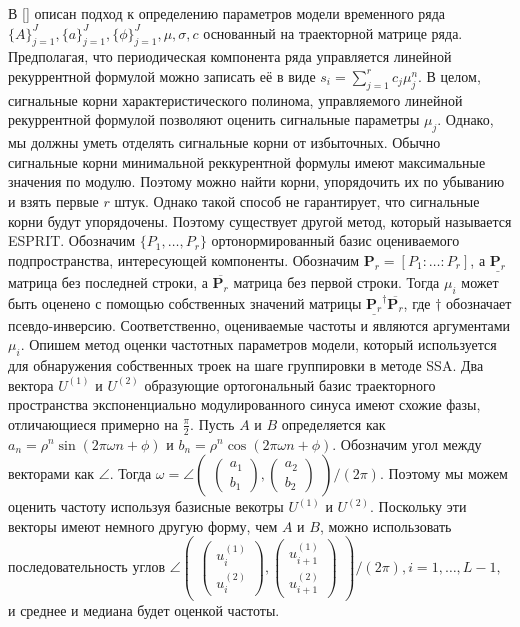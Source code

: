\documentclass[%
12pt,
master,  %
natbib,      %
subf,        %
substylefile = spbu.rtx,
href,        %
colorlinks,  %
]{disser}
\begin{document}
В [] описан подход к определению параметров модели временного ряда $ \{A\}_{j=1}^J,  \{a\}_{j=1}^J,  \{\phi\}_{j=1}^J, \mu, \sigma, c $ основанный на траекторной матрице ряда. Предполагая, что периодическая компонента ряда управляется линейной рекуррентной формулой можно записать её в виде $s_i = \sum_{j=1}^r c_j \mu_j^n$. В целом, сигнальные корни характеристического полинома, управляемого линейной рекуррентной формулой позволяют оценить сигнальные параметры $\mu_j$. Однако, мы должны уметь отделять сигнальные корни от избыточных. Обычно сигнальные корни минимальной реккурентной формулы имеют максимальные значения по модулю. Поэтому можно найти корни, упорядочить их по убыванию и взять первые $r$ штук. Однако такой способ не гарантирует, что сигнальные корни будут упорядочены. Поэтому существует другой метод, который называется ESPRIT.
Обозначим $\{P_1, \dots, P_r \}$ ортонормированный базис оцениваемого подпространства, интересующей компоненты. Обозначим $\textbf{P}_r = [P_1 : \dots : P_r ]$, а $\underline{\textbf{P}_r}$ матрица без последней строки, а $\overline{\textbf{P}_r}$  матрица без первой строки. Тогда $\mu_i$ может быть оценено с помощью собственных значений матрицы $\underline{\textbf{P}_r}^{\dagger}\overline{\textbf{P}_r}$, где $\dagger$ обозначает псевдо-инверсию. Соответственно, оцениваемые частоты и являются аргументами $\mu_i$.
Опишем метод оценки частотных параметров модели, который используется для обнаружения собственных троек на шаге группировки в методе SSA. Два вектора $U^{(1)}$ и $U^{(2)}$ образующие ортогональный базис траекторного пространства экспоненциально модулированного синуса имеют схожие фазы, отличающиеся примерно на $\frac{\pi}{2}$. Пусть $A$ и $B$ определяется как $a_n = \rho^n \sin(2\pi \omega n + \phi)$ и $b_n = \rho^n \cos(2\pi \omega n + \phi)$. Обозначим угол между векторами как $\angle$. Тогда $\omega = \angle  \begin{pmatrix} \begin{pmatrix}a_1\\b_1\end{pmatrix}, \begin{pmatrix}a_2\\b_2\end{pmatrix} \end{pmatrix} \bigg/ (2\pi).$ Поэтому мы можем оценить частоту используя базисные векотры $U^{(1)}$ и $U^{(2)}$. Поскольку эти векторы имеют немного другую форму, чем $A$ и $B$, можно использовать последовательность углов $\angle  \begin{pmatrix} \begin{pmatrix}u_i^{(1)}\\u_i^{(2)}\end{pmatrix}, \begin{pmatrix}u_{i+1}^{(1)}\\u_{i+1}^{(2)}\end{pmatrix} \end{pmatrix} \bigg/ (2\pi), i = 1, \dots , L - 1,$ и среднее и медиана будет оценкой частоты.
\end{document}
